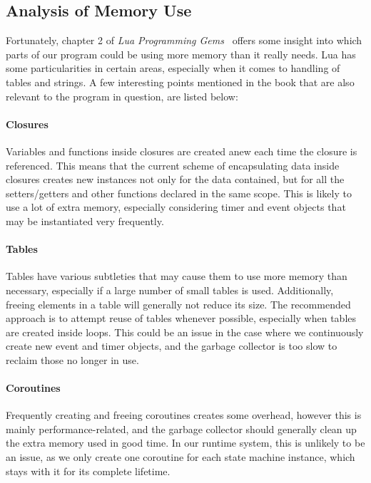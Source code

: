 \subsection{Analysis of Memory Use}
\label{sec:memory_analysis}
Fortunately, chapter 2 of \emph{Lua Programming Gems}~\cite{chapter:lua_performance_tips} offers some insight into which parts of our program could be using more memory than it really needs. Lua has some particularities in certain areas, especially when it comes to handling of tables and strings. A few interesting points mentioned in the book that are also relevant to the program in question, are listed below:

\paragraph{Closures} Variables and functions inside closures are created anew each time the closure is referenced. This means that the current scheme of encapsulating data inside closures creates new instances not only for the data contained, but for all the setters/getters and other functions declared in the same scope. This is likely to use a lot of extra memory, especially considering timer and event objects that may be instantiated very frequently.

\paragraph{Tables} Tables have various subtleties that may cause them to use more memory than necessary, especially if a large number of small tables is used. Additionally, freeing elements in a table will generally not reduce its size. The recommended approach is to attempt reuse of tables whenever possible, especially when tables are created inside loops. This could be an issue in the case where we continuously create new event and timer objects, and the garbage collector is too slow to reclaim those no longer in use.

\paragraph{Coroutines} Frequently creating and freeing coroutines creates some overhead, however this is mainly performance-related, and the garbage collector should generally clean up the extra memory used in good time. In our runtime system, this is unlikely to be an issue, as we only create one coroutine for each state machine instance, which stays with it for its complete lifetime.

